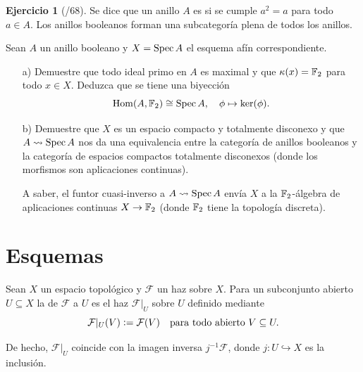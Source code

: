\documentclass{article}
\numberwithin{equation}{section}
\newcounter{ejerctot}
\newcommand{\ejerccount}{\stepcounter{ejerctot}\theejerctot/68}
\theoremstyle{definition}
\newtheorem{ejerc}{Ejercicio}[section]
\begin{document}
\begin{ejerc}[\ejerccount]
  Se dice que un anillo $A$ es  si se cumple $a^2 = a$ para todo
  $a \in A$. Los anillos booleanos forman una subcategoría plena de todos
  los anillos.

  Sean $A$ un anillo booleano y $X = \operatorname{Spec} A$ el esquema afín correspondiente.

  \begin{enumerate}
  \item[a)] Demuestre que todo ideal primo en $A$ es maximal y que
    $\kappa (x) = \mathbb{F}_2$ para todo $x \in X$. Deduzca que se tiene una biyección
    $$\operatorname{Hom} (A, \mathbb{F}_2) \cong \operatorname{Spec} A, \quad \phi \mapsto \ker(\phi).$$

  \item[b)] Demuestre que $X$ es un espacio compacto y totalmente disconexo
    y que $A \rightsquigarrow \operatorname{Spec} A$ nos da una equivalencia entre
    la categoría de anillos booleanos y la categoría de espacios compactos
    totalmente disconexos (donde los morfismos son aplicaciones continuas).

    A saber, el funtor cuasi-inverso a $A \rightsquigarrow \operatorname{Spec} A$ envía $X$
    a la $\mathbb{F}_2$-álgebra de aplicaciones continuas $X \to \mathbb{F}_2$ (donde $\mathbb{F}_2$
    tiene la topología discreta).
  \end{enumerate}
\end{ejerc}


\pagebreak
\section{Esquemas}


\begin{definicion}
  \label{dfn:resticcion-de-haz}
  Sean $X$ un espacio topológico y $\mathcal{F}$ un haz sobre $X$.
  Para un subconjunto abierto $U \subseteq X$ la  de
  $\mathcal{F}$ a $U$ es el haz $\mathcal{F}|_U$ sobre $U$ definido mediante
  \[ \mathcal{F}|_U (V) \mathrel{\mathop:}= \mathcal{F} (V) \quad
    \text{para todo abierto }V \subseteq U. \]
\end{definicion}

De hecho, $\mathcal{F}|_U$ coincide con la imagen inversa $j^{-1} \mathcal{F}$,
donde $j\colon U\hookrightarrow X$ es la inclusión.
\end{document}
